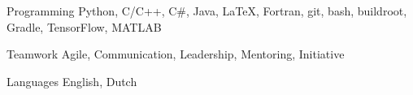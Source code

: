 

\begin{cvskills}

  \cvskill
    {Programming} %
    {Python, C/C++, C\#, Java, LaTeX, Fortran, git, bash, buildroot, Gradle, TensorFlow, MATLAB} %

  \cvskill
    {Teamwork}
    {Agile, Communication, Leadership, Mentoring, Initiative} 

  \cvskill
    {Languages} %
    {English, Dutch} %

\end{cvskills}
